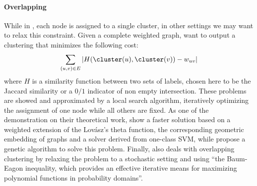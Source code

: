 \paragraph{Overlapping \pcc{}}

While in \pcc{}, each node is assigned to a single cluster, in other settings we may want to relax
this constraint. Given a complete weighted graph, \textcite{Bonchi2012} want to output a clustering
\cluster{} that minimizes the following cost: \[ \sum_{(u,v)\in E} \left| H(\cluster(u),
\cluster(v)) - w_{uv}\right|\] where $H$ is a similarity function between two sets of labels, chosen
here to be the Jaccard similarity or a $0/1$ indicator of non empty intersection. These problems are
showed \NPc{} and approximated by a local search algorithm, iteratively optimizing the assignment of
one node while all others are fixed. As one of the demonstration on their theoretical work,
\textcite{WeightedTheta15} show a faster solution based on a weighted extension of the Lovász's
theta function, the corresponding geometric embedding of graphs and a solver derived from one-class
SVM, while \textcite{GeneticOCC14} propose a genetic algorithm to solve this problem. Finally,
\Textcite{StochasticCC13} also deals with overlapping clustering by relaxing the problem to a
stochastic setting and using \enquote{the Baum-Eagon inequality, which provides an effective
iterative means for maximizing polynomial functions in probability domains}.

\paragraph{\msc{}} 

